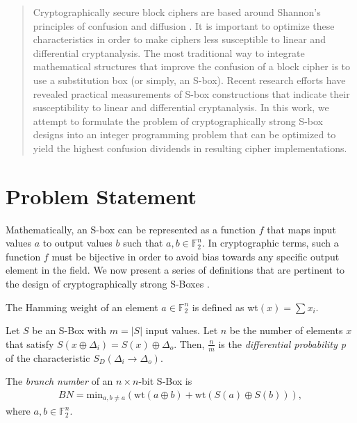 \documentclass[11pt]{article}
\newcommand{\field}[1]{\mathbb{#1}} %
\begin{document}

\begin{abstract}
Cryptographically secure block ciphers are based around Shannon's principles of confusion and diffusion \cite{Kim90astudy}. It is important to optimize these characteristics in order to make ciphers less susceptible to linear and differential cryptanalysis. The most traditional way to integrate mathematical structures that improve the confusion of a block cipher is to use a substitution box  (or simply, an S-box). Recent research efforts have revealed practical measurements of S-box constructions that indicate their susceptibility to linear and differential cryptanalysis. In this work, we attempt to formulate the problem of cryptographically strong S-box designs into an integer programming problem that can be optimized to yield the highest confusion dividends in resulting cipher implementations.
\end{abstract}

\section{Problem Statement}

Mathematically, an S-box can be represented as a function $f$ that maps input values $a$ to output values $b$ such that $a,b \in \field{F}_2^n$. In cryptographic terms, such a function $f$ must be bijective in order to avoid bias towards any specific output element in the field. We now present a series of definitions that are pertinent to the design of cryptographically strong S-Boxes \cite{Mar_newanalysis}.


\begin{define}
The Hamming weight of an element $a \in \field{F}_2^n$ is defined as wt$(x) = \sum x_i$.
\end{define}

\begin{define}
Let $S$ be an S-Box with $m = |S|$ input values. Let $n$ be the number of elements $x$ that satisfy $S(x \oplus \Delta_i) = S(x) \oplus \Delta_o$. Then, $\frac{n}{m}$ is the \emph{differential probability p} of the characteristic $S_D(\Delta_i \to \Delta_o)$.
\end{define}

\begin{define}
The \emph{branch number} of an $n \times n$-bit S-Box is
\begin{eqnarray*}
BN = \text{min}_{a, b\not=a}(\text{wt}(a \oplus b) + \text{wt}(S(a) \oplus S(b))),
\end{eqnarray*}
where $a, b \in \field{F}_2^n$.
\end{define}
\end{document}
